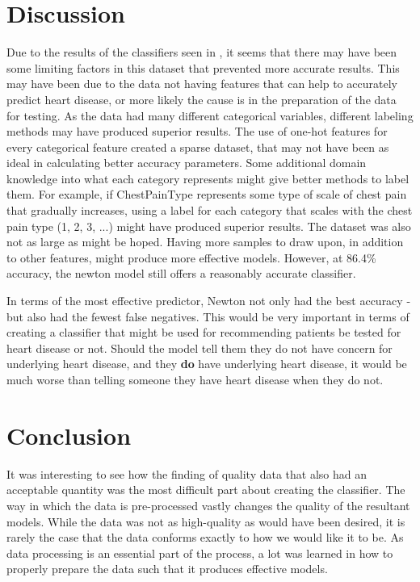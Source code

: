 \documentclass[12pt,conference]{IEEEtran}
\begin{document}
\section{Discussion}
Due to the results of the classifiers seen in , it seems that there may have been some limiting factors in this dataset that prevented more accurate results. This may have been due to the data not having features that can help to accurately predict heart disease, or more likely the cause is in the preparation of the data for testing. As the data had many different categorical variables, different labeling methods may have produced superior results. The use of one-hot features for every categorical feature created a sparse dataset, that may not have been as ideal in calculating better accuracy parameters. Some additional domain knowledge into what each category represents might give better methods to label them. For example, if ChestPainType represents some type of scale of chest pain that gradually increases, using a label for each category that scales with the chest pain type (1, 2, 3, ...) might have produced superior results. The dataset was also not as large as might be hoped. Having more samples to draw upon, in addition to other features, might produce more effective models. However, at 86.4\% accuracy, the newton model still offers a reasonably accurate classifier.

In terms of the most effective predictor, Newton not only had the best accuracy - but also had the fewest false negatives. This would be very important in terms of creating a classifier that might be used for recommending patients be tested for heart disease or not. Should the model tell them they do not have concern for underlying heart disease, and they \textbf{do} have underlying heart disease, it would be much worse than telling someone they have heart disease when they do not.

\section{Conclusion}
It was interesting to see how the finding of quality data that also had an acceptable quantity was the most difficult part about creating the classifier. The way in which the data is pre-processed vastly changes the quality of the resultant models. While the data was not as high-quality as would have been desired, it is rarely the case that the data conforms exactly to how we would like it to be. As data processing is an essential part of the process, a lot was learned in how to properly prepare the data such that it produces effective models.
\end{document}
